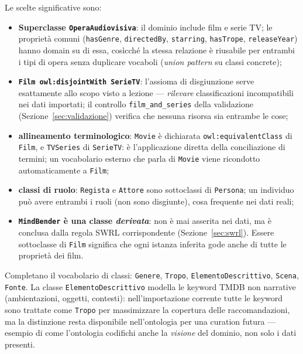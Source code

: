 \documentclass[a4paper,11pt]{article}
\newcommand{\code}[1]{\texttt{#1}}
\begin{document}
Le scelte significative sono:

\begin{itemize}
  \item \textbf{Superclasse \code{OperaAudiovisiva}}: il dominio include
        film e serie TV; le propriet\`a comuni (\code{hasGenre},
        \code{directedBy}, \code{starring}, \code{hasTrope},
        \code{releaseYear}) hanno domain su di essa, cos\`icch\'e la stessa
        relazione \`e riusabile per entrambi i tipi di opera senza
        duplicare vocaboli (\emph{union pattern} su classi concrete);
  \item \textbf{\code{Film owl:disjointWith SerieTV}}: l'assioma di
        disgiunzione serve esattamente allo scopo visto a lezione ---
        \emph{rilevare} classificazioni incompatibili nei dati importati;
        il controllo \code{film\_and\_series} della validazione
        (Sezione~\ref{sec:validazione}) verifica che nessuna risorsa sia
        entrambe le cose;
  \item \textbf{allineamento terminologico}: \code{Movie} \`e dichiarata
        \code{owl:equivalentClass} di \code{Film}, e \code{TVSeries} di
        \code{SerieTV}: \`e l'applicazione diretta della
        conciliazione di termini; un vocabolario esterno che parla di
        \code{Movie} viene ricondotto automaticamente a \code{Film};
  \item \textbf{classi di ruolo}: \code{Regista} e \code{Attore} sono
        sottoclassi di \code{Persona}; un individuo pu\`o avere entrambi i
        ruoli (non sono disgiunte), cosa frequente nei dati reali;
  \item \textbf{\code{MindBender} \`e una classe \emph{derivata}}: non \`e
        mai asserita nei dati, ma \`e conclusa dalla regola SWRL
        corrispondente (Sezione~\ref{sec:swrl}). Essere sottoclasse di
        \code{Film} significa che ogni istanza inferita gode anche di tutte
        le propriet\`a dei film.
\end{itemize}

Completano il vocabolario di classi: \code{Genere}, \code{Tropo},
\code{ElementoDescrittivo}, \code{Scena}, \code{Fonte}. La classe
\code{ElementoDescrittivo} modella le keyword TMDB non narrative
(ambientazioni, oggetti, contesti): nell'importazione corrente tutte le
keyword sono trattate come \code{Tropo} per massimizzare la copertura delle
raccomandazioni, ma la distinzione resta disponibile nell'ontologia per una
curation futura --- esempio di come l'ontologia codifichi anche la
\emph{visione} del dominio, non solo i dati presenti.
\end{document}
